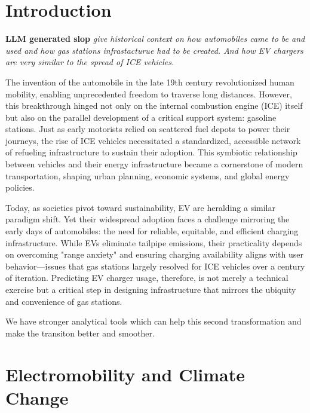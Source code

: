 



\chapter*{Introduction\;}
\textbf{LLM generated slop}
\textit{give historical context on how automobiles came to be and used and how gas stations infrastacturue had to be created. And how EV chargers are very similar to the spread of ICE vehicles.}


The invention of the automobile in the late 19th century revolutionized human mobility, enabling unprecedented freedom to traverse long distances. However, this breakthrough hinged not only on the internal combustion engine (ICE) itself but also on the parallel development of a critical support system: gasoline stations. Just as early motorists relied on scattered fuel depots to power their journeys, the rise of ICE vehicles necessitated a standardized, accessible network of refueling infrastructure to sustain their adoption. This symbiotic relationship between vehicles and their energy infrastructure became a cornerstone of modern transportation, shaping urban planning, economic systems, and global energy policies.

Today, as societies pivot toward sustainability, \acrfull{EV} are heralding a similar paradigm shift. Yet their widespread adoption faces a challenge mirroring the early days of automobiles: the need for reliable, equitable, and efficient charging infrastructure. While EVs eliminate tailpipe emissions, their practicality depends on overcoming "range anxiety" and ensuring charging availability aligns with user behavior—issues that gas stations largely resolved for ICE vehicles over a century of iteration. Predicting EV charger usage, therefore, is not merely a technical exercise but a critical step in designing infrastructure that mirrors the ubiquity and convenience of gas stations.

We have stronger analytical tools which can help this second transformation and make the transiton better and smoother.


\setchapterpreamble[u]{\margintoc}
\chapter{Electromobility and Climate Change}

